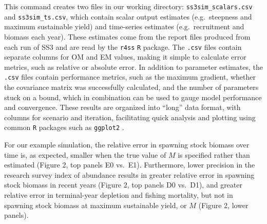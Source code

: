 \documentclass[12pt]{article}
\begin{document}
\noindent
This command creates two files in our working directory: \texttt{ss3sim\_scalars.csv} and \texttt{ss3sim\_ts.csv}, which contain scalar output estimates (e.g.~steepness and maximum sustainable yield) and time-series estimates (e.g.~recruitment and biomass each year). These estimates come from the report files produced from each run of SS3 and are read by the \texttt{r4ss} \texttt{R} package. The \texttt{.csv} files contain separate columns for OM and EM values, making it simple to calculate error metrics, such as relative or absolute error. In addition to parameter estimates, the \texttt{.csv} files contain performance metrics, such as the maximum gradient, whether the covariance matrix was successfully calculated, and the number of parameters stuck on a bound, which in combination can be used to gauge model performance and convergence. These results are organized into ``long'' data format, with columns for scenario and iteration, facilitating quick analysis and plotting using common \texttt{R} packages such as \texttt{ggplot2} \cite{wickham2009}.

For our example simulation, the relative error in spawning stock biomass over time is, as expected, smaller when the true value of $M$ is specified rather than estimated (Figure 2, top panels E0 vs.~E1). Furthermore, lower precision in the research survey index of abundance results in greater relative error in spawning stock biomass in recent years (Figure 2, top panels D0 vs.~D1), and greater relative error in terminal-year depletion and fishing mortality, but not in spawning stock biomass at maximum sustainable yield, or $M$ (Figure 2, lower panels).
\end{document}

